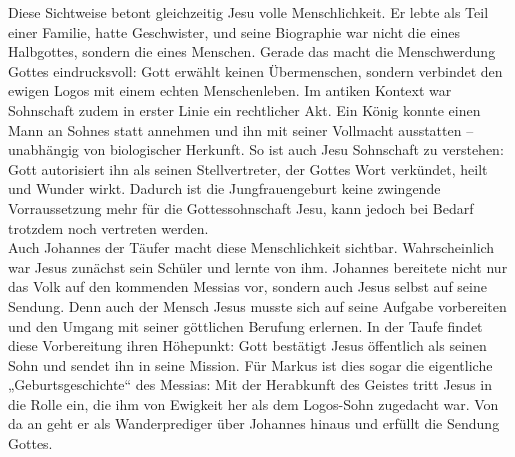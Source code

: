 Diese Sichtweise betont gleichzeitig Jesu volle Menschlichkeit. Er lebte als Teil einer Familie, hatte Geschwister, und seine Biographie war nicht die eines Halbgottes, sondern die eines Menschen. Gerade das macht die Menschwerdung Gottes eindrucksvoll: Gott erwählt keinen Übermenschen, sondern verbindet den ewigen Logos mit einem echten Menschenleben. Im antiken Kontext war Sohnschaft zudem in erster Linie ein rechtlicher Akt. Ein König konnte einen Mann an Sohnes statt annehmen und ihn mit seiner Vollmacht ausstatten – unabhängig von biologischer Herkunft. So ist auch Jesu Sohnschaft zu verstehen: Gott autorisiert ihn als seinen Stellvertreter, der Gottes Wort verkündet, heilt und Wunder wirkt. Dadurch ist die Jungfrauengeburt keine zwingende Vorraussetzung mehr für die Gottessohnschaft Jesu, kann jedoch bei Bedarf trotzdem noch vertreten werden.\\

Auch Johannes der Täufer macht diese Menschlichkeit sichtbar. Wahrscheinlich war Jesus zunächst sein Schüler und lernte von ihm. Johannes bereitete nicht nur das Volk auf den kommenden Messias vor, sondern auch Jesus selbst auf seine Sendung. Denn auch der Mensch Jesus musste sich auf seine Aufgabe vorbereiten und den Umgang mit seiner göttlichen Berufung erlernen. In der Taufe findet diese Vorbereitung ihren Höhepunkt: Gott bestätigt Jesus öffentlich als seinen Sohn und sendet ihn in seine Mission. Für Markus ist dies sogar die eigentliche „Geburtsgeschichte“ des Messias: Mit der Herabkunft des Geistes tritt Jesus in die Rolle ein, die ihm von Ewigkeit her als dem Logos-Sohn zugedacht war. Von da an geht er als Wanderprediger über Johannes hinaus und erfüllt die Sendung Gottes.

